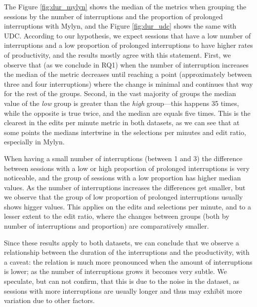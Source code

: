 \documentclass[times]{smrauth}
\begin{document}

The Figure \ref{fig:dur_mylyn} shows the median of the metrics when grouping the sessions by the number of interruptions and the proportion of prolonged interruptions with Mylyn, and the Figure \ref{fig:dur_udc} shows the same with UDC. According to our hypothesis, we expect sessions that have a low number of interruptions and a low proportion of prolonged interruptions to have higher rates of productivity, and the results mostly agree with this statement. First, we observe that (as we conclude in RQ1) when the number of interruption increases the median of the metric decreases until reaching a point (approximately between three and four interruptions) where the change is minimal and continues that way for the rest of the groups. Second, in the vast majority of groups the median value of the \emph{low} group is greater than the \emph{high} group---this happens 35 times, while the opposite is true twice, and the median are equals five times. This is the clearest in the edits per minute metric in both datasets, as we can see that at some points the medians intertwine in the selections per minutes and edit ratio, especially in Mylyn.

When having a small number of interruptions (between 1 and 3) the difference between sessions with a low or high proportion of prolonged interruptions is very noticeable, and the group of sessions with a low proportion has higher median values. As the number of interruptions increases the differences get smaller, but we observe that the group of low proportion of prolonged interruptions usually shows higger values. This applies on the edits and selections per minute, and to a lesser extent to the edit ratio, where the changes between groups (both by number of interruptions and proportion) are comparatively smaller.

Since these results apply to both datasets, we can conclude that we observe a relationship between the duration of the interruptions and the productivity, with a caveat: the relation is much more pronounced when the amount of interruptions is lower; as the number of interruptions grows it becomes very subtle. We speculate, but can not confirm, that this is due to the noise in the dataset, as sessions with more interruptions are usually longer and thus may exhibit more variation due to other factors.
\end{document}
